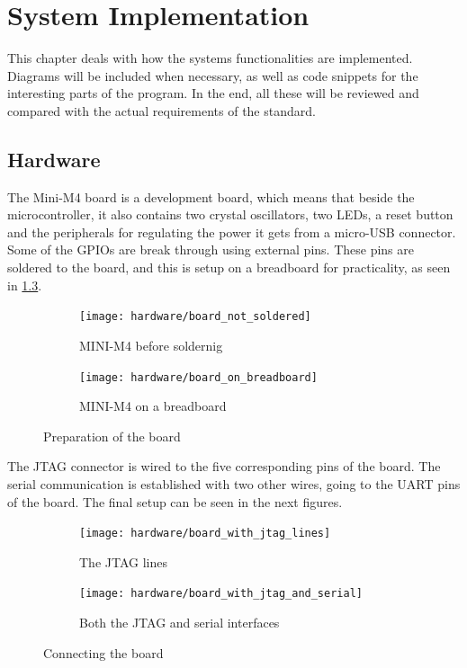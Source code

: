 
\newcommand{\excreturn}{EXC\_RETURN}

\chapter{System Implementation}
This chapter deals with how the system\textquotesingle s functionalities 
are implemented. Diagrams will be included when necessary, as well as code 
snippets for the interesting parts of the program. In the end, all these
will be reviewed and compared with the actual requirements of the standard.

\section{Hardware}
The Mini-M4 board is a development board, which means that beside the 
microcontroller, it also contains two crystal oscillators, two LEDs, a reset 
button and the peripherals for regulating the power it gets from
a micro-USB connector.
Some of the GPIOs are break through using external pins.
These pins are soldered to the board, and this is setup on a breadboard
for practicality, as seen in \ref{fig:photo1}.

\begin{figure}[H]
\begin{subfigure}{0.5\textwidth}
  \centering
  \texttt{[image: hardware/board\_not\_soldered]}
  \caption{MINI-M4 before soldernig}
  \label{fig:sub1}
\end{subfigure}%
\begin{subfigure}{0.5\textwidth}
  \centering
  \texttt{[image: hardware/board\_on\_breadboard]}
  \caption{MINI-M4 on a breadboard}
  \label{fig:sub2}
\end{subfigure}
\caption{Preparation of the board}
\label{fig:photo1}
\end{figure}

The JTAG connector is wired to the five corresponding pins of the
board. The serial communication is established with two other wires, going
to the UART pins of the board.
The final setup can be seen in the next figures.

\begin{figure}[H]
\centering
\begin{subfigure}{.5\textwidth}
  \centering
  \texttt{[image: hardware/board\_with\_jtag\_lines]}
  \caption{The JTAG lines}
  \label{fig:sub1}
\end{subfigure}%
\begin{subfigure}{.5\textwidth}
  \centering
  \texttt{[image: hardware/board\_with\_jtag\_and\_serial]}
  \caption{Both the JTAG and serial interfaces}
  \label{fig:sub2}
\end{subfigure}
\caption{Connecting the board}
\label{fig:photo2}
\end{figure}

